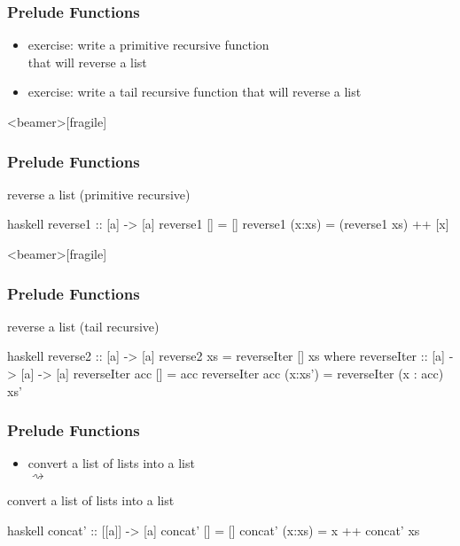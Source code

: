 \documentclass[dvipsnames]{beamer}
\theoremstyle{plain}
\begin{document}
\begin{frame}
  \frametitle{Prelude Functions}

  \begin{itemize}
    \item exercise: write a primitive recursive function\\
      that will reverse a list
    \item exercise: write a tail recursive function that will reverse a list
  \end{itemize}
\end{frame}

\begin{frame}<beamer>[fragile]
  \frametitle{Prelude Functions}

  \begin{exampleblock}{reverse a list (primitive recursive)}
    \begin{pygments}{haskell}
reverse1 :: [a] -> [a]
reverse1 [] = []
reverse1 (x:xs) = (reverse1 xs) ++ [x]
    \end{pygments}
  \end{exampleblock}
\end{frame}

\begin{frame}<beamer>[fragile]
  \frametitle{Prelude Functions}

  \begin{exampleblock}{reverse a list (tail recursive)}
    \begin{pygments}{haskell}
reverse2 :: [a] -> [a]
reverse2 xs = reverseIter [] xs
  where
    reverseIter :: [a] -> [a] -> [a]
    reverseIter acc [] = acc
    reverseIter acc (x:xs') = reverseIter (x : acc) xs'
    \end{pygments}
  \end{exampleblock}
\end{frame}

\begin{frame}[fragile]
  \frametitle{Prelude Functions}

  \begin{itemize}
    \item convert a list of lists into a list\\
      \pygment{haskell}{concat [[2,3],[],[4]} $\rightsquigarrow$
  \end{itemize}

  \begin{exampleblock}{convert a list of lists into a list}
    \begin{pygments}{haskell}
concat' :: [[a]] -> [a]
concat' [] = []
concat' (x:xs) = x ++ concat' xs
    \end{pygments}
  \end{exampleblock}
\end{frame}
\end{document}
